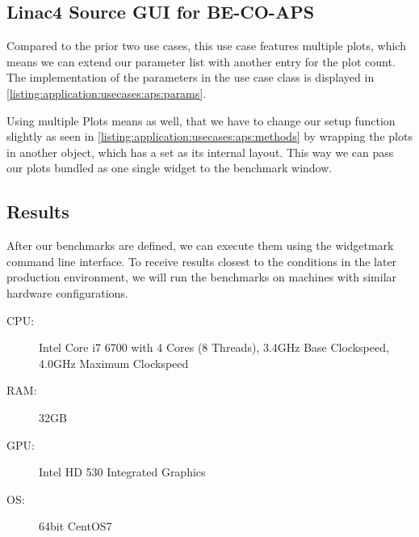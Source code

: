 

\subsection{Linac4 Source GUI for BE-CO-APS}

Compared to the prior two use cases, this use case features multiple plots,
which means we can extend our parameter list with another entry for the plot
count. The implementation of the parameters in the use case class is displayed
in \ref{listing:application:usecases:aps:params}.



Using multiple Plots means as well, that we have to change our setup function
slightly as seen in \ref{listing:application:usecases:aps:methods} by wrapping
the plots in another  object, which has a
 set as its internal layout. This way
we can pass our plots bundled as one single widget to the benchmark window.



\subsection{Results}

After our benchmarks are defined, we can execute them using the widgetmark
command line interface. To receive results closest to the conditions in the
later production environment, we will run the benchmarks on machines with
similar hardware configurations.

\begin{description}

    \item[CPU:] Intel Core i7 6700 with 4 Cores (8 Threads),
                3.4GHz Base Clockspeed,
                4.0GHz Maximum Clockspeed

    \item[RAM:] 32GB

    \item[GPU:] Intel HD 530 Integrated Graphics

    \item[OS:] 64bit CentOS7

\end{description}

